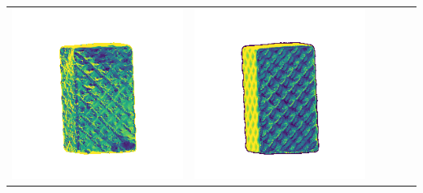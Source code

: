 \begin{tabularx}{\linewidth}{@{}Y@{}Y@{}Y@{}Y@{}Y@{}Y@{}}
\includegraphics[width=\linewidth]{semisynthetic/20160617_18_yu_err.png} &
\includegraphics[width=\linewidth]{semisynthetic/20160617_18_dpsn_err.png} &

\end{tabularx}
